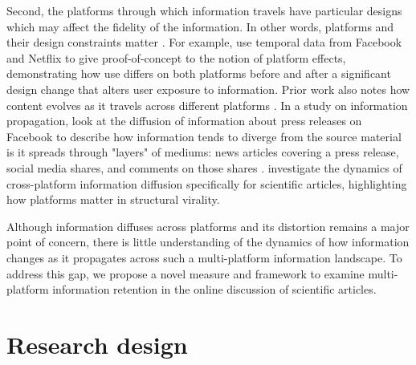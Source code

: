 \documentclass[letterpaper]{article} %
\begin{document}
Second, the platforms through which information travels have particular designs which may affect the fidelity of the information. In other words, platforms and their design constraints matter \citep{malikIdentifyingPlatformEffects2016,gligoricHowConstraintsAffect2018}. For example, \citet{malikIdentifyingPlatformEffects2016} use temporal data from Facebook and Netflix to give proof-of-concept to the notion of platform effects, demonstrating how use differs on both platforms before and after a significant design change that alters user exposure to information. Prior work also notes how content evolves as it travels across different platforms \citep{leskovecMemetrackingDynamicsNews2009,tanLostPropagationUnfolding2016,phadkeManyFacedHate2020}. In a study on information propagation, \citet{tanLostPropagationUnfolding2016} look at the diffusion of information about press releases on Facebook to describe how information tends to diverge from the source material is it spreads through "layers" of mediums: news articles covering a press release, social media shares, and comments on those shares \citep{tanLostPropagationUnfolding2016}.
\citet{zakhlebinDiffusionScientificArticles2020} investigate the dynamics of cross-platform information diffusion specifically for scientific articles, highlighting how platforms matter in structural virality.


Although information diffuses across platforms and its distortion remains a major point of concern, there is little understanding of the dynamics of how information changes as it propagates across such a multi-platform information landscape. To address this gap, we propose a novel measure and framework to examine multi-platform information retention in the online discussion of scientific articles.


\section{Research design}
\end{document}
